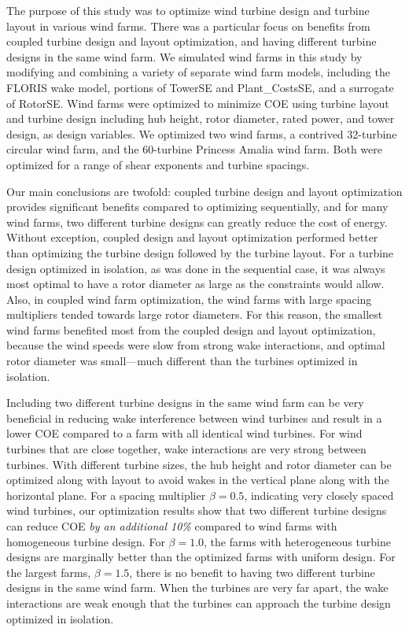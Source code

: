 The purpose of this study was to optimize wind turbine design and turbine layout in various wind farms. There was a particular focus on benefits from coupled turbine design and layout optimization, and having different turbine designs in the same wind farm. We simulated wind farms in this study by modifying and combining a variety of separate wind farm models, including the FLORIS wake model, portions of TowerSE and Plant\_CostsSE, and a surrogate of RotorSE. Wind farms were optimized to minimize COE using turbine layout and turbine design including hub height, rotor diameter, rated power, and tower design, as design variables. We optimized two wind farms, a contrived 32-turbine circular wind farm, and the 60-turbine Princess Amalia wind farm. Both were optimized for a range of shear exponents and turbine spacings. 

Our main conclusions are twofold: coupled turbine design and layout optimization provides significant benefits compared to optimizing sequentially, and for many wind farms, two different turbine designs can greatly reduce the cost of energy. Without exception, coupled design and layout optimization performed better than optimizing the turbine design followed by the turbine layout. For a turbine design optimized in isolation, as was done in the sequential case, it was always most optimal to have a rotor diameter as large as the constraints would allow. Also, in coupled wind farm optimization, the wind farms with large spacing multipliers tended towards large rotor diameters. For this reason, the smallest wind farms benefited most from the coupled design and layout optimization, because the wind speeds were slow from strong wake interactions, and optimal rotor diameter was small---much different than the turbines optimized in isolation.

Including two different turbine designs in the same wind farm can be very beneficial in reducing wake interference between wind turbines and result in a lower COE compared to a farm with all identical wind turbines. For wind turbines that are close together, wake interactions are very strong between turbines. With different turbine sizes, the hub height and rotor diameter can be optimized along with layout to avoid wakes in the vertical plane along with the horizontal plane. For a spacing multiplier $\beta=0.5$, indicating very closely spaced wind turbines, our optimization results show that two different turbine designs can reduce COE \textit{by an additional 10\%} compared to wind farms with homogeneous turbine design. For $\beta=1.0$, the farms with heterogeneous turbine designs are marginally better than the optimized farms with uniform design. For the largest farms, $\beta=1.5$, there is no benefit to having two different turbine designs in the same wind farm. When the turbines are very far apart, the wake interactions are weak enough that the turbines can approach the turbine design optimized in isolation. 

